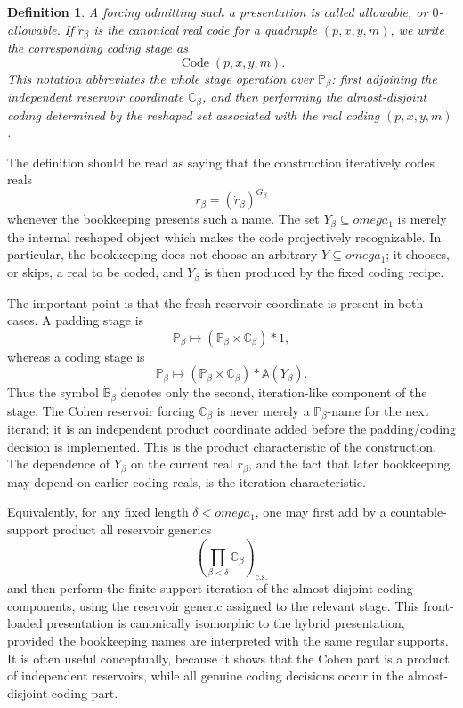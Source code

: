 \documentclass{article}
\newtheorem{definition}[theorem]{Definition}
\theoremstyle{remark}
\theoremstyle{plain}
\newcommand{\forceP}{\mathbb{P}}
\newcommand{\one}{\mathbf{1}}
\newcommand{\Code}{\operatorname{Code}}
\def\mathbf#1{#1}%
\def\omega{omega}%
\begin{document}
\begin{definition}
A forcing admitting such a presentation is called \emph{allowable}, or \emph{\(0\)-allowable}. If \(\dot r_\beta\) is the canonical real code for a quadruple \((p,x,y,m)\), we write the corresponding coding stage as
\[
   \Code(p,x,y,m).
\]
This notation abbreviates the whole stage operation over \(\forceP_\beta\): first adjoining the independent reservoir coordinate \(\mathbb C_\beta\), and then performing the almost-disjoint coding determined by the reshaped set associated with the real coding \((p,x,y,m)\).
\end{definition}

The definition should be read as saying that the construction iteratively codes reals
\[
   r_\beta=(\dot r_\beta)^{G_\beta}
\]
whenever the bookkeeping presents such a name. The set \(Y_\beta\subseteq\omega_1\) is merely the internal reshaped object which makes the code projectively recognizable. In particular, the bookkeeping does not choose an arbitrary \(Y\subseteq\omega_1\); it chooses, or skips, a real to be coded, and \(Y_\beta\) is then produced by the fixed coding recipe.

The important point is that the fresh reservoir coordinate is present in both cases. A padding stage is
\[
   \forceP_\beta \longmapsto (\forceP_\beta\times\mathbb C_\beta)*\one,
\]
whereas a coding stage is
\[
   \forceP_\beta \longmapsto
   (\forceP_\beta\times\mathbb C_\beta)*\mathbb A(Y_\beta).
\]
Thus the symbol \(\dot{\mathbb B}_\beta\) denotes only the second, iteration-like component of the stage. The Cohen reservoir forcing \(\mathbb C_\beta\) is never merely a \(\forceP_\beta\)-name for the next iterand; it is an independent product coordinate added before the padding/coding decision is implemented. This is the product characteristic of the construction. The dependence of \(Y_\beta\) on the current real \(r_\beta\), and the fact that later bookkeeping may depend on earlier coding reals, is the iteration characteristic.

Equivalently, for any fixed length \(\delta<\omega_1\), one may first add by a countable-support product all reservoir generics
\[
   \left(\prod_{\beta<\delta}\mathbb C_\beta\right)_{\mathrm{c.s.}}
\]
and then perform the finite-support iteration of the almost-disjoint coding components, using the reservoir generic assigned to the relevant stage. This front-loaded presentation is canonically isomorphic to the hybrid presentation, provided the bookkeeping names are interpreted with the same regular supports. It is often useful conceptually, because it shows that the Cohen part is a product of independent reservoirs, while all genuine coding decisions occur in the almost-disjoint coding part.
\end{document}
